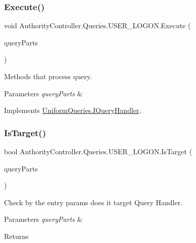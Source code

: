 \subsubsection{\texorpdfstring{Execute()}{Execute()}}
{\footnotesize\ttfamily void Authority\+Controller.\+Queries.\+U\+S\+E\+R\+\_\+\+L\+O\+G\+O\+N.\+Execute (\begin{DoxyParamCaption}\item[{\mbox{\hyperlink{struct_uniform_queries_1_1_query_part}{Query\+Part}} \mbox{[}$\,$\mbox{]}}]{query\+Parts }\end{DoxyParamCaption})}



Methods that process query. 


\begin{DoxyParams}{Parameters}
{\em query\+Parts} & \\
\hline
\end{DoxyParams}


Implements \mbox{\hyperlink{interface_uniform_queries_1_1_i_query_handler_a66d15db03bdd5b0caf6eef96f9b803c0}{Uniform\+Queries.\+I\+Query\+Handler}}.

\mbox{\label{class_authority_controller_1_1_queries_1_1_u_s_e_r___l_o_g_o_n_a53261c6c60dc1a2324a67adf19f7547a}} 
\subsubsection{\texorpdfstring{Is\+Target()}{IsTarget()}}
{\footnotesize\ttfamily bool Authority\+Controller.\+Queries.\+U\+S\+E\+R\+\_\+\+L\+O\+G\+O\+N.\+Is\+Target (\begin{DoxyParamCaption}\item[{\mbox{\hyperlink{struct_uniform_queries_1_1_query_part}{Query\+Part}} \mbox{[}$\,$\mbox{]}}]{query\+Parts }\end{DoxyParamCaption})}



Check by the entry params does it target Query Handler. 


\begin{DoxyParams}{Parameters}
{\em query\+Parts} & \\
\hline
\end{DoxyParams}
\begin{DoxyReturn}{Returns}

\end{DoxyReturn}


